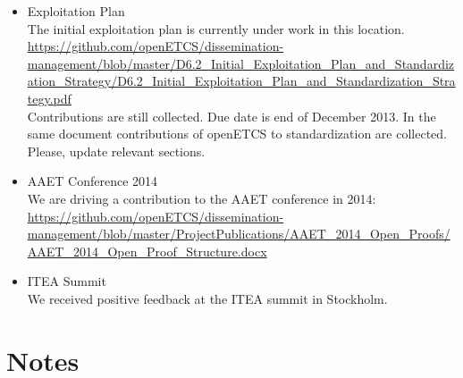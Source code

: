 \documentclass[a4paper, 11pt]{article}
\begin{document}
\begin{itemize}

\item Exploitation Plan\\
The initial exploitation plan is currently under work in this location. \url{https://github.com/openETCS/dissemination-management/blob/master/D6.2_Initial_Exploitation_Plan_and_Standardization_Strategy/D6.2_Initial_Exploitation_Plan_and_Standardization_Strategy.pdf}\\

Contributions are still collected. Due date is end of December 2013. In the same document contributions of openETCS to standardization are collected. Please, update relevant sections.


\item AAET Conference 2014\\
We are driving a contribution to the AAET conference in 2014:
\url{https://github.com/openETCS/dissemination-management/blob/master/ProjectPublications/AAET_2014_Open_Proofs/AAET_2014_Open_Proof_Structure.docx}



\item ITEA Summit\\
We received positive feedback at the ITEA summit in Stockholm. 

\end{itemize}

\section{Notes}
\end{document}
